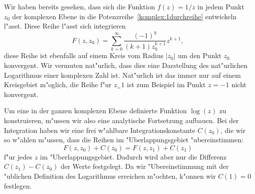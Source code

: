 \begin{beispiel}
Wir haben bereits gesehen, dass sich die Funktion $f(z)=1/z$ in jedem
Punkt $z_0$ der komplexen Ebene in die Potenzreihe~\ref{komplex:1durchreihe}
entwickeln l"asst.
Diese Reihe l"asst sich integrieren
\[
F(z,z_0)
=
\sum_{k=0}^\infty\frac{(-1)^k}{(k+1)z_0^{k+1}}z^{k+1},
\]
diese Reihe ist ebenfalls auf einem Kreis vom Radius $|z_0|$ um den
Punkt $z_0$ konvergent.
Wir vermuten nat"urlich, dass dies eine Darstellung des nat"urlichen
Logarithmus einer komplexen Zahl ist.
Nat"urlich ist das immer nur auf einem Kreisgebiet m"oglich, die Reihe
f"ur $z_=1$ ist zum Beispiel im Punkt $z=-1$ nicht konvergent.

Um eine in der ganzen komplexen Ebene definierte Funktion $\log(z)$ zu
konstruieren, m"ussen wir also eine analytische Fortsetzung aufbauen.
Bei der Integration haben wir eine frei w"ahlbare Integrationskonstante
$C(z_0)$, die wir so w"ahlen m"ussen, dass die Reihen im "Uberlappungsgebiet
"ubereinstimmen:
\[
F(z,z_0) + C(z_0) = F(z,z_1)  + C(z_1)
\]
f"ur jedes $z$ im "Uberlappungsgebiet.
Dadurch wird aber nur die Differenz $C(z_1)-C(z_0)$ der Werte festgelegt.
Da wir "Ubereinstimmung mit der "ublichen Definition des Logarithmus
erreichen m"ochten, k"onnen wir $C(1)=0$ festlegen.


\end{beispiel}
